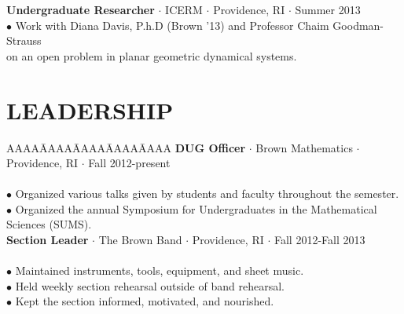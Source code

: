 \documentclass{res}
\begin{document}
\begin{resume}
\begin{tabbing}
{\bf Undergraduate Researcher} $\cdot$ ICERM $\cdot$ Providence, RI $\cdot$ Summer 2013\\
	\>$\bullet$ Work with Diana Davis, P.h.D (Brown '13) and Professor Chaim Goodman-Strauss\\\>\phantom{$\bullet$} on an open problem in planar geometric dynamical systems.\\

   \end{tabbing}
\sectionVspace %
\section{LEADERSHIP}
\myvspace
\begin{tabbing}
   AAAA\=AAAA\=AAAA\=AAAA\=AAAA\kill
{\bf DUG Officer} $\cdot$ Brown Mathematics $\cdot$ Providence, RI $\cdot$ Fall 2012-present\\
	\\
	\>$\bullet$ Organized various talks given by students and faculty throughout the semester. \\
	\>$\bullet$ Organized the annual Symposium for Undergraduates in the Mathematical Sciences (SUMS).\\
\sbreak
{\bf Section Leader} $\cdot$ The Brown Band $\cdot$ Providence, RI $\cdot$ Fall 2012-Fall 2013\\
	\\
	\>$\bullet$ Maintained instruments, tools, equipment, and sheet music.\\ 
	\>$\bullet$ Held weekly section rehearsal outside of band rehearsal.\\
	\>$\bullet$ Kept the section informed, motivated, and nourished.\\
\end{tabbing}
\sectionVspace %

\end{resume}
\end{document}
